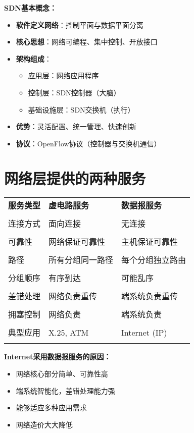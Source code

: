 \documentclass[lang=cn,newtx,10pt,scheme=chinese]{../../elegantbook}
\begin{document}
\textbf{SDN基本概念：}
\begin{itemize}
  \item \textbf{软件定义网络}：控制平面与数据平面分离
  \item \textbf{核心思想}：网络可编程、集中控制、开放接口
  \item \textbf{架构组成}：
    \begin{itemize}
      \item 应用层：网络应用程序
      \item 控制层：SDN控制器（大脑）
      \item 基础设施层：SDN交换机（执行）
    \end{itemize}
  \item \textbf{优势}：灵活配置、统一管理、快速创新
  \item \textbf{协议}：OpenFlow协议（控制器与交换机通信）
\end{itemize}

\section{网络层提供的两种服务}

\begin{longtable}{@{}p{3cm}p{5cm}p{5cm}@{}}
\toprule
\textbf{服务类型} & \textbf{虚电路服务} & \textbf{数据报服务} \\\\ \midrule
\endhead

连接方式 & 面向连接 & 无连接 \\\\
可靠性 & 网络保证可靠性 & 主机保证可靠性 \\\\
路径 & 所有分组同一路径 & 每个分组独立路由 \\\\
分组顺序 & 有序到达 & 可能乱序 \\\\
差错处理 & 网络负责重传 & 端系统负责重传 \\\\
拥塞控制 & 网络负责 & 端系统负责 \\\\
典型应用 & X.25, ATM & Internet (IP) \\\\

\bottomrule
\end{longtable}

\textbf{Internet采用数据报服务的原因：}
\begin{itemize}
  \item 网络核心部分简单、可靠性高
  \item 端系统智能化，差错处理能力强
  \item 能够适应多种应用需求
  \item 网络造价大大降低
\end{itemize}
\end{document}
